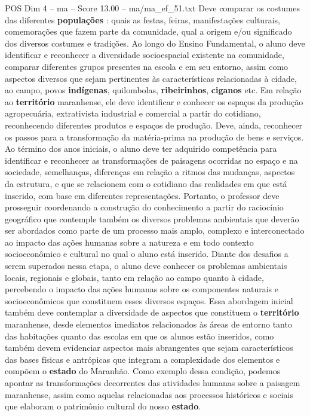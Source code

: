 \begin{textsample}{POS Dim 4 – ma – Score 13.00 – ma/ma\_ef\_51.txt}
Deve comparar os costumes das diferentes \textbf{populações} : quais as festas, feiras, manifestações culturais, comemorações que fazem parte da comunidade, qual a origem e/ou significado dos diversos costumes e tradições.
Ao longo do Ensino Fundamental, o aluno deve identificar e reconhecer a diversidade socioespacial existente na comunidade, comparar diferentes grupos presentes na escola e em seu entorno, assim como aspectos diversos que sejam pertinentes às características relacionadas à cidade, ao campo, povos \textbf{indígenas}, quilombolas, \textbf{ribeirinhos}, \textbf{ciganos} etc.
Em relação ao \textbf{território} maranhense, ele deve identificar e conhecer os espaços da produção agropecuária, extrativista industrial e comercial a partir do cotidiano, reconhecendo diferentes produtos e espaços de produção.
Deve, ainda, reconhecer os passos para a transformação da matéria-prima na produção de bens e serviços.
Ao término dos anos iniciais, o aluno deve ter adquirido competência para identificar e reconhecer as transformações de paisagens ocorridas no espaço e na sociedade, semelhanças, diferenças em relação a ritmos das mudanças, aspectos da estrutura, e que se relacionem com o cotidiano das realidades em que está inserido, com base em diferentes representações.
Portanto, o professor deve prosseguir coordenando a construção do conhecimento a partir do raciocínio geográfico que contemple também os diversos problemas ambientais que deverão ser abordados como parte de um processo mais amplo, complexo e interconectado ao impacto das ações humanas sobre a natureza e em todo contexto socioeconômico e cultural no qual o aluno está inserido.
Diante dos desafios a serem superados nessa etapa, o aluno deve conhecer os problemas ambientais locais, regionais e globais, tanto em relação ao campo quanto à cidade, percebendo o impacto das ações humanas sobre os componentes naturais e socioeconômicos que constituem esses diversos espaços.
Essa abordagem inicial também deve contemplar a diversidade de aspectos que constituem o \textbf{território} maranhense, desde elementos imediatos relacionados às áreas de entorno tanto das habitações quanto das escolas em que os alunos estão inseridos, como também devem evidenciar aspectos mais abrangentes que sejam característicos das bases físicas e antrópicas que integram a complexidade dos elementos e compõem o \textbf{estado} do Maranhão.
Como exemplo dessa condição, podemos apontar as transformações decorrentes das atividades humanas sobre a paisagem maranhense, assim como aquelas relacionadas aos processos históricos e sociais que elaboram o patrimônio cultural do nosso \textbf{estado}.

\end{textsample}
